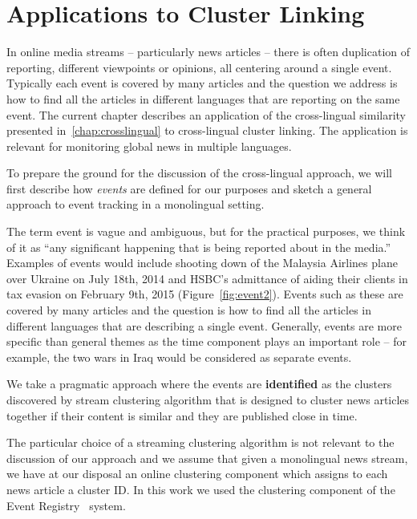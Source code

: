 %
\chapter{Applications to Cluster Linking}\label{chap:applications}

In online media streams -- particularly news articles -- there is often duplication of reporting,
different viewpoints or opinions, all centering around a single event. Typically each event is covered by many articles
and the question we address is how to find all the articles in different languages that are reporting on the same event.
The current chapter describes an application of the cross-lingual similarity presented in~\ref{chap:crosslingual}
to cross-lingual cluster linking. The application is relevant for monitoring global news in multiple languages.

To prepare the ground for the discussion of the cross-lingual approach, we will first
describe how \emph{events} are defined for our purposes and  
sketch a general approach to event tracking in a monolingual setting.

The term event is vague and ambiguous, but for the practical purposes,
we think of it as ``any significant happening that is being reported about in the media.''
Examples of events would include shooting down of the Malaysia Airlines plane over Ukraine
on July 18th, 2014 and HSBC's admittance of aiding their clients in tax evasion on
February 9th, 2015 (Figure~\ref{fig:event2}). Events such as these are covered by many
articles and the question is how to find all the articles in different languages
that are describing a single event. Generally, events are more specific than
general themes as the time component plays an important role -- for example,
the two wars in Iraq would be considered as separate events.

We take a pragmatic approach where the events are \textbf{identified} as the clusters
discovered by stream clustering algorithm that is designed to cluster
news articles together if their content is similar and they are published
close in time. 

The particular choice of a streaming clustering algorithm is not relevant
to the discussion of our approach and we assume that given a monolingual news stream, we have
at our disposal an online clustering component which assigns to each news
article a cluster ID. In this work we used the clustering
component of the Event Registry~\cite{Leban2014W,Leban2014I} system.

